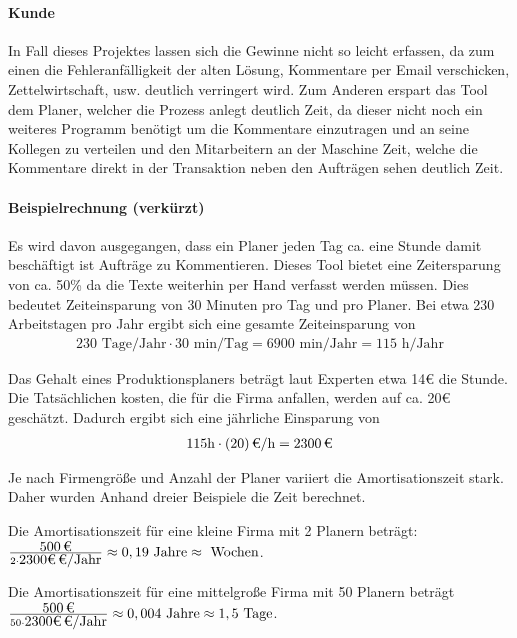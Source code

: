 \paragraph{Kunde}
In Fall dieses Projektes lassen sich die Gewinne nicht so leicht erfassen, da zum einen die Fehleranfälligkeit der alten Lösung, Kommentare per Email verschicken, Zettelwirtschaft, usw. deutlich verringert wird. Zum Anderen erspart das Tool dem Planer, welcher die Prozess anlegt deutlich Zeit, da dieser nicht noch ein weiteres Programm benötigt um die Kommentare einzutragen und an seine Kollegen zu verteilen und den Mitarbeitern an der Maschine Zeit, welche die Kommentare direkt in der Transaktion neben den Aufträgen sehen deutlich Zeit. 

\paragraph{Beispielrechnung (verkürzt)}
Es wird davon ausgegangen, dass ein Planer jeden Tag ca. eine Stunde damit beschäftigt ist Aufträge zu Kommentieren. Dieses Tool bietet eine Zeitersparung von ca. 50\% da die Texte weiterhin per Hand verfasst werden müssen. Dies bedeutet Zeiteinsparung von 30 Minuten pro Tag und pro Planer. Bei etwa 230 Arbeitstagen pro Jahr ergibt sich eine gesamte Zeiteinsparung von  
\begin{eqnarray}
230 \mbox{ Tage/Jahr} \cdot 30 \mbox{ min/Tag} = 6900 \mbox{ min/Jahr} = 115 \mbox{ h/Jahr} 
\end{eqnarray}

Das Gehalt eines Produktionsplaners beträgt laut Experten etwa 14€ die Stunde. Die Tatsächlichen kosten, die für die Firma anfallen, werden auf ca. 20€ geschätzt.
Dadurch ergibt sich eine jährliche Einsparung von 
\begin{eqnarray}
115 \mbox{h} \cdot \eur{(20)}{\mbox{/h}} = \eur{2300}
\end{eqnarray}

Je nach Firmengröße und Anzahl der Planer variiert die Amortisationszeit stark. Daher wurden Anhand dreier Beispiele die Zeit berechnet.

Die Amortisationszeit für eine kleine Firma mit 2 Planern beträgt:
$\frac{\eur{500}}{2 \cdot \eur{2300€} \mbox{/Jahr} } \approx 0,19 \mbox{ Jahre} \approx  \mbox{ Wochen}$.

Die Amortisationszeit für eine mittelgroße Firma mit 50 Planern beträgt
$\frac{\eur{500}}{50 \cdot \eur{2300€} \mbox{/Jahr} } \approx 0,004 \mbox{ Jahre} \approx 1,5 \mbox{ Tage}$.

